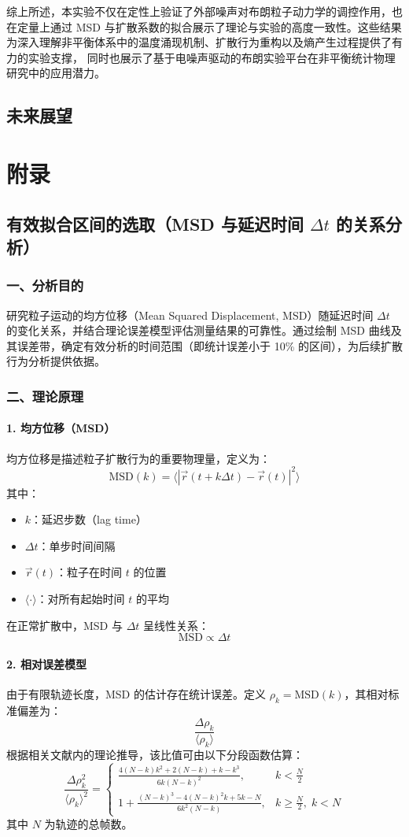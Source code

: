 \documentclass[a4paper]{report} %
\begin{document}
综上所述，本实验不仅在定性上验证了外部噪声对布朗粒子动力学的调控作用，也在定量上通过 MSD 与扩散系数的拟合展示了理论与实验的高度一致性。这些结果为深入理解非平衡体系中的温度涌现机制、扩散行为重构以及熵产生过程提供了有力的实验支撑，
同时也展示了基于电噪声驱动的布朗实验平台在非平衡统计物理研究中的应用潜力。

\section{未来展望}

\chapter{附录}
\section{有效拟合区间的选取（MSD 与延迟时间 $\Delta t$ 的关系分析）}
\subsection*{一、分析目的}

研究粒子运动的均方位移（Mean Squared Displacement, MSD）随延迟时间 $\Delta t$ 的变化关系，并结合理论误差模型评估测量结果的可靠性。通过绘制 MSD 曲线及其误差带，确定有效分析的时间范围（即统计误差小于 10\% 的区间），为后续扩散行为分析提供依据。

\subsection*{二、理论原理}
\subsubsection*{1. 均方位移（MSD）}
均方位移是描述粒子扩散行为的重要物理量，定义为：
\[
\text{MSD}(k) = \langle |\vec{r}(t + k\Delta t) - \vec{r}(t)|^2 \rangle
\]
其中：
\begin{itemize}
    \item $k$：延迟步数（lag time）
    \item $\Delta t$：单步时间间隔
    \item $\vec{r}(t)$：粒子在时间 $t$ 的位置
    \item $\langle \cdot \rangle$：对所有起始时间 $t$ 的平均
\end{itemize}
在正常扩散中，MSD 与 $\Delta t$ 呈线性关系：
\[
\text{MSD} \propto \Delta t
\]
\subsubsection*{2. 相对误差模型}
由于有限轨迹长度，MSD 的估计存在统计误差。定义 $\rho_k = \text{MSD}(k)$，其相对标准偏差为：
\[
\frac{\Delta \rho_k}{\langle \rho_k \rangle}
\]
根据相关文献内的理论推导\cite{qian1991spt}，该比值可由以下分段函数估算：
\[
\frac{\Delta \rho_k^2}{\langle \rho_k \rangle^2} =
\begin{cases}
\displaystyle \frac{4(N-k)k^2 + 2(N-k) + k - k^3}{6k(N-k)^2}, & k < \tfrac{N}{2} \\[2ex]
\displaystyle 1 + \frac{(N-k)^3 - 4(N-k)^2 k + 5k - N}{6k^2(N-k)}, & k \geq \tfrac{N}{2},\; k < N
\end{cases}
\]
其中 $N$ 为轨迹的总帧数。
\end{document}
